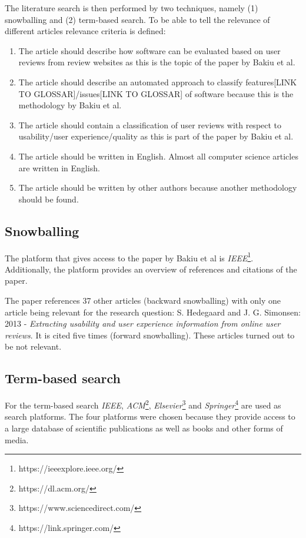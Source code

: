 The literature search is then performed by two techniques, namely (1) snowballing and (2) term-based search. To be able to tell the relevance of different articles relevance criteria is defined:
\begin{enumerate}
    \item The article should describe how software can be evaluated based on user reviews from review websites as this is the topic of the paper by Bakiu et al.
    \item The article should describe an automated approach to classify features[LINK TO GLOSSAR]/issues[LINK TO GLOSSAR] of software because this is the methodology by Bakiu et al.
    \item The article should contain a classification of user reviews with respect to usability/user experience/quality as this is part of the paper by Bakiu et al.
    \item The article should be written in English. Almost all computer science articles are written in English.
    \item The article should be written by other authors because another methodology should be found.
\end{enumerate}

\subsection*{Snowballing}
The platform that gives access to the paper by Bakiu et al is \textit{IEEE}\footnote{https://ieeexplore.ieee.org/}. Additionally, the platform provides an overview of references and citations of the paper.

The paper references 37 other articles (backward snowballing)  with only one article being relevant for the research question: S. Hedegaard and J. G. Simonsen: 2013 - \textit{Extracting usability and user experience information from online user reviews}\cite{Hedegaard2013}. It is cited five times (forward snowballing). These articles turned out to be not relevant.

\subsection*{Term-based search}
For the term-based search \textit{IEEE}, \textit{ACM}\footnote{https://dl.acm.org/}, \textit{Elsevier}\footnote{https://www.sciencedirect.com/} and \textit{Springer}\footnote{https://link.springer.com/} are used as search platforms. The four platforms were chosen because they provide access to a large database of scientific publications as well as books and other forms of media.

